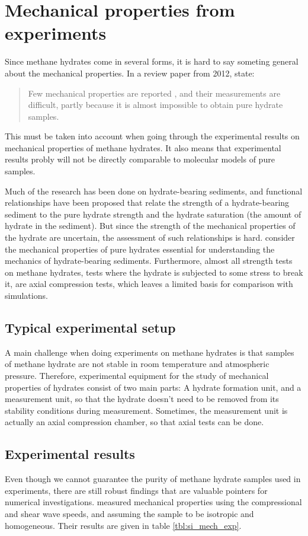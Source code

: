 \section{Mechanical properties from experiments}
Since methane hydrates come in several forms, it is hard to say someting general about the mechanical properties. In a review paper from 2012, \citet{Ning2012} state:
\begin{quotation}
Few mechanical properties are reported , and their measurements are difficult, partly because it is almost impossible to obtain pure hydrate samples.
\end{quotation}
%
This must be taken into account when going through the experimental results on mechanical properties of methane hydrates. It also means that experimental results probly will not be directly comparable to molecular models of pure samples.

Much of the research has been done on hydrate-bearing sediments, and functional relationships have been proposed that relate the strength of a hydrate-bearing sediment to the pure hydrate strength and the hydrate saturation (the amount of hydrate in the sediment). But since the strength of the mechanical properties of the hydrate are uncertain, the assessment of such relationships is hard. \citet{Ning2012} consider the mechanical properties of pure hydrates essential for understanding the mechanics of hydrate-bearing sediments. Furthermore, almost all strength tests on methane hydrates, tests where the hydrate is subjected to some stress to break it, are axial compression tests, which leaves a limited basis for comparison with simulations. 

\subsection{Typical experimental setup}
A main challenge when doing experiments on methane hydrates is that samples of methane hydrate are not stable in room temperature and atmospheric pressure. Therefore, experimental equipment for the study of mechanical properties of hydrates consist of two main parts: A hydrate formation unit, and a measurement unit, so that the hydrate doesn't need to be removed from its stability conditions during measurement. Sometimes, the measurement unit is actually an axial compression chamber, so that axial tests can be done.

\subsection{Experimental results}
Even though we cannot guarantee the purity of methane hydrate samples used in experiments, there are still robust findings that are valuable pointers for numerical investigations. \citet{Waite2000} measured mechanical properties using the compressional and shear wave speeds, and assuming the sample to be isotropic and homogeneous. Their results are given in table \ref{tbl:si_mech_exp}.

